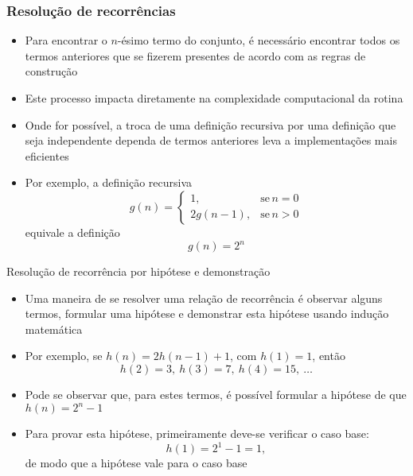 \begin{frame}
    \frametitle{Resolução de recorrências}

    \begin{itemize}
        \item Para encontrar o $n$-ésimo termo do conjunto, é necessário encontrar
        todos os termos anteriores que se fizerem presentes de acordo com as regras
        de construção

        \item Este processo impacta diretamente na complexidade computacional da rotina

        \item Onde for possível, a troca de uma definição recursiva por uma 
        definição que seja independente dependa de termos anteriores
        leva a implementações {mais eficientes}
        
        \item Por exemplo, a definição {recursiva}
        \[
            g(n) = \left\lbrace \begin{array}{ll} 1, & \mbox{se}\, n = 0 \\ 
            2g(n - 1), & \mbox{se}\, n > 0 \end{array}\right.
        \] 
         equivale a definição 
        \[ g(n) = 2^n \]
    \end{itemize}

\end{frame}

\begin{frame}[fragile]{Resolução de recorrência por hipótese e demonstração}

    \begin{itemize}
        \item Uma maneira de se resolver uma relação de recorrência é observar alguns termos,
            formular uma hipótese e demonstrar esta hipótese usando indução matemática

        \item Por exemplo, se $h(n) = 2h(n - 1) + 1$, com $h(1) = 1$, então
        \[
            h(2) = 3,\ h(3) = 7,\ h(4) = 15,\ \ldots
        \]

        \item Pode se observar que, para estes termos, é possível formular a hipótese de que
            $h(n) = 2^n - 1$

        \item Para provar esta hipótese, primeiramente deve-se verificar o caso base:
        \[
            h(1) = 2^1 - 1 = 1,
        \]
        de modo que a hipótese vale para o caso base

    \end{itemize}

\end{frame}

